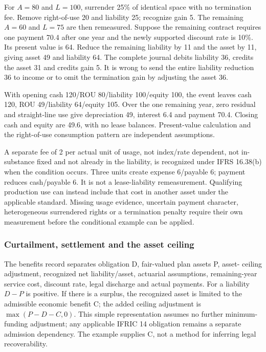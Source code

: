 For \(A=80\) and \(L=100\), surrender 25\% of identical space with no termination fee. Remove right-of-use 20 and liability 25; recognize gain 5. The remaining \(A=60\) and \(L=75\) are then remeasured. Suppose the remaining contract requires one payment 70.4 after one year and the newly supported discount rate is 10\%. Its present value is 64. Reduce the remaining liability by 11 and the asset by 11, giving asset 49 and liability 64. The complete journal debits liability 36, credits the asset 31 and credits gain 5. It is wrong to send the entire liability reduction 36 to income or to omit the termination gain by adjusting the asset 36.

With opening cash 120/ROU 80/liability 100/equity 100, the event leaves cash 120, ROU 49/liability 64/equity 105. Over the one remaining year, zero residual and straight-line use give depreciation 49, interest 6.4 and payment 70.4. Closing cash and equity are 49.6, with no lease balances. Present-value calculation and the right-of-use consumption pattern are independent assumptions.

A separate fee of 2 per actual unit of usage, not index/rate dependent, not in-substance fixed and not already in the liability, is recognized under IFRS 16.38(b) when the condition occurs. Three units create expense 6/payable 6; payment reduces cash/payable 6. It is not a lease-liability remeasurement. Qualifying production use can instead include that cost in another asset under the applicable standard. Missing usage evidence, uncertain payment character, heterogeneous surrendered rights or a termination penalty require their own measurement before the conditional example can be applied.

\hypertarget{curtailment-settlement-and-the-asset-ceiling}{%
\subsubsection{Curtailment, settlement and the asset ceiling}\label{curtailment-settlement-and-the-asset-ceiling}}

The benefits record separates obligation D, fair-valued plan assets P, asset- ceiling adjustment, recognized net liability/asset, actuarial assumptions, remaining-year service cost, discount rate, legal discharge and actual payments. For a liability \(D-P\) is positive. If there is a surplus, the recognized asset is limited to the admissible economic benefit C; the added ceiling adjustment is \(\max(P-D-C,0)\). This simple representation assumes no further minimum-funding adjustment; any applicable IFRIC 14 obligation remains a separate admission dependency. The example supplies C, not a method for inferring legal recoverability.

